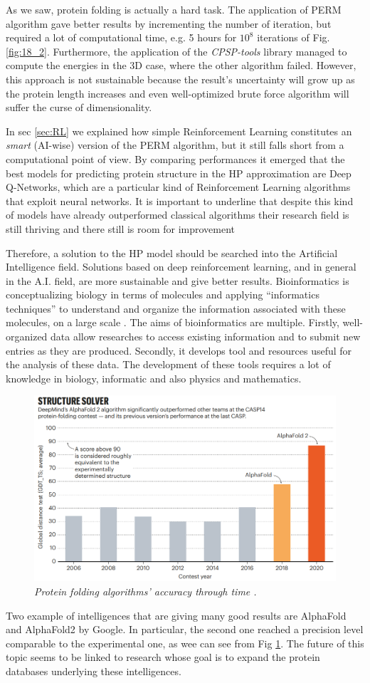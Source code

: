 As we saw, protein folding is actually a hard task.
The application of PERM algorithm gave better results by incrementing the number of iteration, but required a lot of computational time, e.g. 5 hours for $10^8$ iterations of Fig. \ref{fig:18_2}.
Furthermore, the application of the \emph{CPSP-tools} library managed to compute the energies in the 3D case, where the other algorithm failed.
However, this approach is not sustainable because the result's uncertainty will grow up as the protein length increases and even well-optimized brute force algorithm will suffer the curse of dimensionality.

In sec \ref{sec:RL} we explained how simple Reinforcement Learning  constitutes an \emph{smart} (AI-wise) version of the PERM algorithm, but it still falls short from a computational point of view. By comparing performances it emerged that the best models for predicting protein structure in the HP approximation are Deep Q-Networks, which are a particular kind of Reinforcement Learning algorithms that exploit neural networks. It is important to underline that despite this kind of models have already outperformed classical algorithms their research field is still thriving and there still is room for improvement

Therefore, a solution to the HP model should be searched into the Artificial Intelligence field.
Solutions based on deep reinforcement learning, and in general in the A.I. field, are more sustainable and give better results.
Bioinformatics is conceptualizing biology in terms of molecules and applying ``informatics techniques'' to understand and organize the information associated with these molecules, on a large scale \cite{bioinfo}.
The aims of bioinformatics are multiple.
Firstly, well-organized data allow researches to access existing information and to submit new entries as they are produced.
Secondly, it develops tool and resources useful for the analysis of these data.
The development of these tools requires a lot of knowledge in biology, informatic and also physics and mathematics.
\begin{figure}[H]
    \centering
    \includegraphics[width=.75\textwidth]{./img/alphafold.png}
    \caption{\emph{Protein folding algorithms' accuracy through time \cite{alphafold}.}}
    \label{fig:alphafold}
\end{figure}
Two example of intelligences that are giving many good results are AlphaFold and AlphaFold2 by Google.
In particular, the second one reached a precision level comparable to the experimental one, as wee can see from Fig \ref{fig:alphafold}.
The future of this topic seems to be linked to research whose goal is to expand the protein databases underlying these intelligences.
